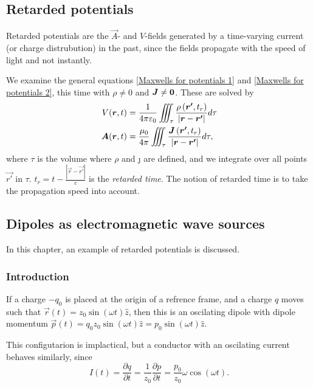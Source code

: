 \subsection{Retarded potentials}
    Retarded potentials are the $\vec{A}$- and $V$-fields generated by a time-varying current (or charge distrubution) in the past, 
    since the fields propagate with the speed of light and not instantly. 
    
    We examine the general equations \eqref{Maxwells for potentials 1} and \eqref{Maxwells for potentials 2}, this time with $\rho \neq 0$ and $\bm{J} \neq \bm{0}$.
    These are solved by 
    \begin{align} 
        \label{retarded potentials 1}
        V(\bm{r}, t) &= \frac{1}{4\pi\varepsilon_0} \iiint_\tau \frac{\rho\left(\bm{r'}, t_r\right)}{|\bm{r} - \bm{r'}|}d\tau \\
        \bm{A}(\bm{r}, t) &= \frac{\mu_0}{4\pi} \iiint_\tau \frac{\bm{J}\left(\bm{r'}, t_r\right)}{|\bm{r} - \bm{r'}|}d\tau,
        \label{retarded potentials 2}
    \end{align}
    where $\tau$ is the volume where $\rho$ and \j{} are defined, 
    and we integrate over all points $\vec{r'}$ in $\tau$.
    $t_r = t - \frac{|\vec{r} - \vec{r'}|}{c}$ is the \textit{retarded time}. 
    The notion of retarded time is to take the propagation speed into account.

\subsection{Dipoles as electromagnetic wave sources}
    In this chapter, an example of retarded potentials is discussed. 

    \subsubsection*{Introduction}
        If a charge $-q_0$ is placed at the origin of a refrence frame, 
        and a charge $q$ moves such that $\vec{r}(t) = z_0 \sin\left(\omega t\right) \hat{z}$, 
        then this is an oscilating dipole with dipole momentum 
        $\vec{p}\left(t\right) = q_0 z_0 \sin\left(\omega t\right)\hat{z} = p_0 \sin\left(\omega t\right)\hat{z}$.

        This configutarion is implactical, but a conductor with an oscilating current behaves similarly, since
        \begin{equation*}
            I(t) = \frac{\partial q}{\partial t} = \frac{1}{z_0} \frac{\partial p}{\partial t} = \frac{p_0}{z_0}\omega\cos\left(\omega t\right).
        \end{equation*}
    
